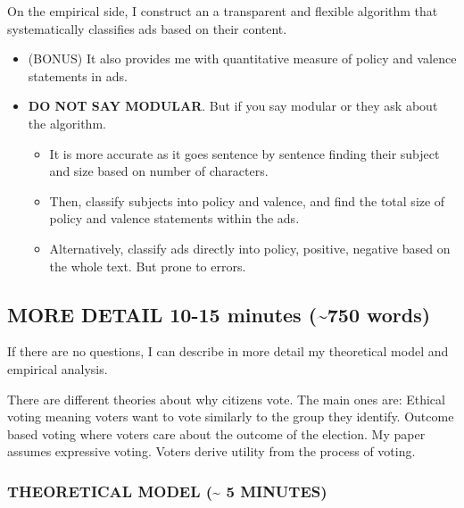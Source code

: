 \documentclass[12pt]{article}
\theoremstyle{plain}
\theoremstyle{plain}
\theoremstyle{plain}
\theoremstyle{plain}
\theoremstyle{plain}
\theoremstyle{plain}
\begin{document}
On the empirical side, I construct an a transparent and flexible algorithm that systematically classifies ads based on their content.
\begin{itemize}
\item (BONUS) It also provides me with quantitative measure of policy and valence statements in ads.
\item \textbf{DO NOT SAY MODULAR}. But if you say modular or they ask about the algorithm.
\begin{itemize}
\item It is more accurate as it goes sentence by sentence finding their subject and size based on number of characters.
\item Then, classify subjects into policy and valence, and find the total size of policy and valence statements within the ads.
\item Alternatively, classify ads directly into policy, positive, negative based on the whole text. But prone to errors.
\end{itemize}
\end{itemize}


\clearpage 
\subsection{MORE DETAIL 10-15 minutes (\textasciitilde{}750 words)}
\label{sec:orgc651c3b}

If there are no questions, I can describe in more detail my theoretical model and empirical analysis.

There are different theories about why citizens vote.
The main ones are:
Ethical voting meaning voters want to vote similarly to the group they identify.
Outcome based voting where voters care about the outcome of the election.
My paper assumes expressive voting. Voters derive utility from the process of voting.

\subsubsection{THEORETICAL MODEL (\textasciitilde{} 5 MINUTES)}
\label{sec:orgf216d74}
\end{document}
